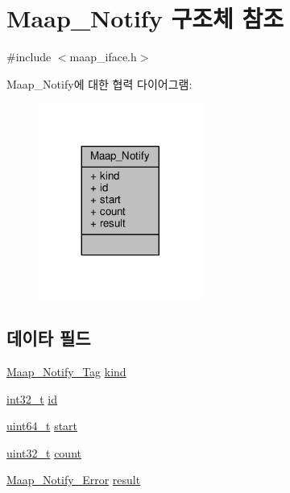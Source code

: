 \hypertarget{struct_maap___notify}{}\section{Maap\+\_\+\+Notify 구조체 참조}
\label{struct_maap___notify}


{\ttfamily \#include $<$maap\+\_\+iface.\+h$>$}



Maap\+\_\+\+Notify에 대한 협력 다이어그램\+:
\nopagebreak
\begin{figure}[H]
\begin{center}
\leavevmode
\includegraphics[width=152pt]{struct_maap___notify__coll__graph}
\end{center}
\end{figure}
\subsection*{데이타 필드}
\begin{DoxyCompactItemize}
\item 
\hyperlink{maap__iface_8h_a0d45e125fb876b383321d96bc510285e}{Maap\+\_\+\+Notify\+\_\+\+Tag} \hyperlink{struct_maap___notify_a28725ddb5295895b12a48456f73a5665}{kind}
\item 
\hyperlink{parse_8c_a37994e3b11c72957c6f454c6ec96d43d}{int32\+\_\+t} \hyperlink{struct_maap___notify_a2708c0bbb6f926149707c2c61fe43c3e}{id}
\item 
\hyperlink{parse_8c_aec6fcb673ff035718c238c8c9d544c47}{uint64\+\_\+t} \hyperlink{struct_maap___notify_a6a51e9baeec9b06ae477cf6475efc71d}{start}
\item 
\hyperlink{parse_8c_a6eb1e68cc391dd753bc8ce896dbb8315}{uint32\+\_\+t} \hyperlink{struct_maap___notify_a86988a65e0d3ece7990c032c159786d6}{count}
\item 
\hyperlink{maap__iface_8h_aad86c36b2cb1c22bfa5e2e5032f808dd}{Maap\+\_\+\+Notify\+\_\+\+Error} \hyperlink{struct_maap___notify_a9d66bc8bbfd0a30a80edda69603ea9ba}{result}
\end{DoxyCompactItemize}


